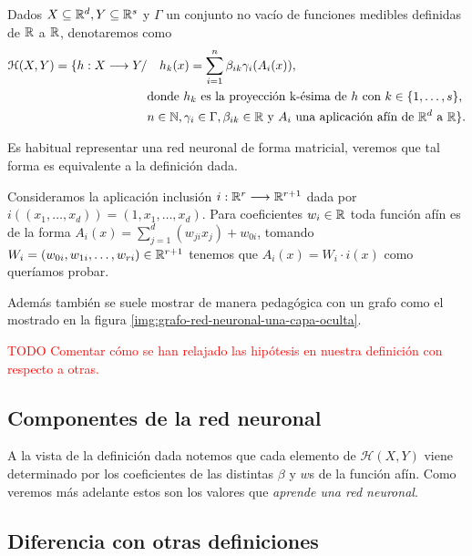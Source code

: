 \begin{definicion} \label{definition:redes_neuronales_una_capa_oculta}
    Dados $X \subseteq \mathbb{R}^d, Y \subseteq \mathbb{R}^s$ y  $\Gamma$ un conjunto no vacío de funciones medibles definidas de $\mathbb{R}$ a $\mathbb{R}$, denotaremos como 
    \begin{align}
        \mathcal{H}(X,Y) 
        =
        \{
            h : X \longrightarrow Y 
            /& \quad 
            h_k(x) = 
            \sum_{i=1}^{n} \beta_{i k} \gamma_{i}( A_{i}(x)), \\
            & \text{donde  $h_k$  es la proyección k-ésima de $h$ con 
            $k \in \{1, \ldots, s\}$}, \\
            & n \in \mathbb{N},\gamma_{i} \in \Gamma , \beta_{i k} \in \mathbb{R}
             \text{ y }A_{i} \text{ una aplicación afín de $\mathbb{R}^d$ a $\mathbb{R}$}           
        \}.
    \end{align}
\end{definicion}

Es habitual representar una red neuronal de forma matricial, veremos que tal forma es equivalente a la definición dada. 

Consideramos la aplicación inclusión 
$i: \mathbb{R}^r \longrightarrow \mathbb{R}^{r+1}$ dada por 
 $i((x_1, \ldots, x_d)) = (1,x_1, \ldots, x_d).$
Para coeficientes $w_i \in \mathbb{R}$ toda función afín es de la forma 
$A_{i}(x)= \sum_{j=1}^d( w_{j i} x_j) + w_{0i}$, 
tomando $W_i = (w_{0 i}, w_{1 i}, \ldots, w_{r i}) \in \mathbb{R}^{r+1}$ tenemos que 
$A_i(x) = W_i \cdot i(x)$ como queríamos probar. 

Además también se suele mostrar de manera pedagógica con un grafo como el mostrado en la 
figura \ref{img:grafo-red-neuronal-una-capa-oculta}.

\textcolor{red}{TODO Comentar cómo se han relajado las hipótesis en nuestra definición con respecto a otras.}

\subsection*{Componentes de la red neuronal}  

A la vista de la definición dada notemos que cada elemento de 
$\mathcal{H}(X,Y)$ viene determinado por los coeficientes 
de las distintas $\beta$ y  $w$s de la función afín. Como veremos más adelante estos son los valores que \textit{aprende una red neuronal}.

\subsection*{Diferencia con otras definiciones}  \label{subsection:diferencia-otras-definiciones-RRNN}

